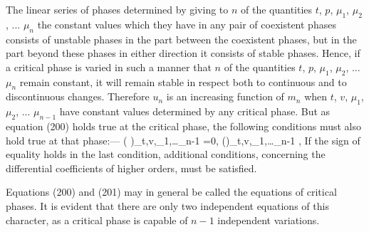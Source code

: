 \documentclass[12pt]{memoir}
\begin{document}
The linear series of phases determined by giving to $n$ of the quantities $t$, $p$, $\mu_1$, $\mu_2$, ... $\mu_n$ the constant values which they have in any pair of coexistent phases consists of unstable phases in the part between the coexistent phases, but in the part beyond these phases in either direction it consists of stable phases. Hence, if a critical phase is varied in such a manner that $n$ of the quantities $t$, $p$, $\mu_1$, $\mu_2$, ... $\mu_n$ remain constant, it will remain stable in respect both to continuous and to discontinuous changes. Therefore $u_n$ is an increasing function of $m_n$ when $t$, $v$, $\mu_1$, $\mu_2$, ... $\mu_{n-1}$ have constant values determined by any critical phase. But as equation (200) holds true at the critical phase, the following conditions must also hold true at that phase:---
\eqs \left( \right)_{t,v,\mu_1,\dots \mu_{n-1}} =0,
\label{201}\eqe
\eqs \left(\right)_{t,v,\mu_1,\dots \mu_{n-1}} ,
\label{202}\eqe
If the sign of equality holds in the last condition, additional conditions, concerning the differential coefficients of higher orders, must be satisfied.


Equations (200) and (201) may in general be called the equations of critical phases. It is evident that there are only two independent equations of this character, as a critical phase is capable of $n - 1$ independent variations.
\end{document}
